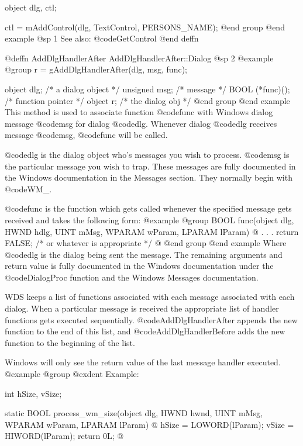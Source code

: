 object  dlg, ctl;

ctl = mAddControl(dlg, TextControl, PERSONS_NAME);
@end group
@end example
@sp 1
See also:  @code{GetControl}
@end deffn






@deffn {AddDlgHandlerAfter} AddDlgHandlerAfter::Dialog
@sp 2
@example
@group
r = gAddDlgHandlerAfter(dlg, msg, func);

object   dlg;      /*  a dialog object  */
unsigned msg;      /*  message          */
BOOL    (*func)(); /*  function pointer */
object  r;         /*  the dialog obj   */
@end group
@end example
This method is used to associate function @code{func} with Windows dialog
message @code{msg} for dialog @code{dlg}.  Whenever dialog @code{dlg}
receives message @code{msg}, @code{func} will be called.

@code{dlg} is the dialog object who's messages you wish to process.
@code{msg} is the particular message you wish to trap.  These messages
are fully documented in the Windows documentation in the Messages
section.  They normally begin with @code{WM_}.

@code{func} is the function which gets called whenever the specified
message gets received and takes the following form:
@example
@group
BOOL    func(object     dlg,
             HWND       hdlg, 
             UINT       mMsg, 
             WPARAM     wParam, 
             LPARAM     lParam)
@{
        .
        .
        .
        return FALSE;  /* or whatever is appropriate  */
@}
@end group
@end example
Where @code{dlg} is the dialog being sent the message.  The remaining
arguments and return value is fully documented in the Windows documentation
under the @code{DialogProc} function and the Windows Messages documentation.

WDS keeps a list of functions associated with each message associated
with each dialog.  When a particular message is received the appropriate
list of handler functions gets executed sequentially.
@code{AddDlgHandlerAfter} appends the new function to the end of this list,
and @code{AddDlgHandlerBefore} adds the new function to the beginning of
the list.

Windows will only see the return value of the last message handler executed.
@example
@group
@exdent Example:

int     hSize, vSize;

static  BOOL    process_wm_size(object  dlg, 
                                HWND    hwnd, 
                                UINT    mMsg, 
                                WPARAM  wParam, 
                                LPARAM  lParam)
@{
        hSize = LOWORD(lParam);
        vSize = HIWORD(lParam);
        return 0L;
@}

